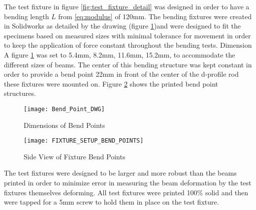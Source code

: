 \par
The test fixture in figure \ref{fig:test_fixture_detail} was designed in order to have a bending length $L$ from \ref{eq:modulus} of 120mm. The bending fixtures were created in Solidworks as detailed by the drawing (figure \ref{fig:Bend_Point_Dwg})and were designed to fit the specimens based on measured sizes with minimal tolerance for movement in order to keep the application of force constant throughout the bending tests. Dimension A figure \ref{fig:Bend_Point_Dwg} was set to 5.4mm, 8.2mm, 11.6mm, 15.2mm, to accommodate the different sizes of beams. The center of this bending structure was kept constant in order to provide a bend point 22mm in front of the center of the d-profile rod these fixtures were mounted on. Figure \ref{fig:Bend_Points} shows the printed bend point structures.\par

\begin{figure} [H]
\centering
	\caption{Dimensions of Bend Points}
	\texttt{[image: Bend\_Point\_DWG]}
	\label{fig:Bend_Point_Dwg}
\end{figure}


\begin{figure} [H]
\centering
	\caption{Side View of Fixture Bend Points}
	\texttt{[image: FIXTURE\_SETUP\_BEND\_POINTS]}
	\label{fig:Bend_Points}
\end{figure}

	The test fixtures were designed to be larger and more robust than the beams printed in order to minimize error in measuring the beam deformation by the test fixtures themselves deforming. All test fixtures were printed 100\% solid and then were tapped for a 5mm screw to hold them in place on the test fixture.


